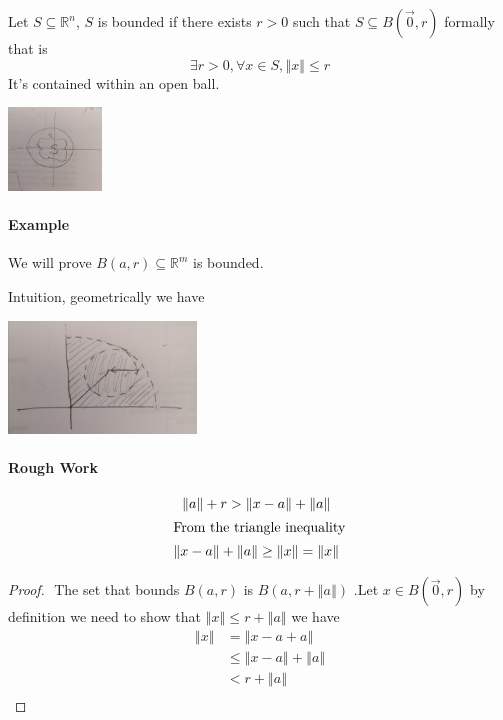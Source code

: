 \documentclass[11pt]{book}
\begin{document}
\begin{defn}[Bounded]\label{defn:bounded}
    Let $S \subseteq \mathbb{R} ^{n} $, $S$ is bounded if there exists $r > 0$ such that $S  \subseteq B\left(\vec{0} , r\right) $ formally that is 
    \[
    \exists r > 0, \forall x \in S, \left\Vert x \right\Vert \le r
    \]
    It's contained within an open ball.
    \begin{center}
        \includegraphics[width=25mm]{assets/lec3-bounded.jpg} 
    \end{center}
\end{defn}

\paragraph{Example} 
We will prove $B\left(a, r\right) \subseteq \mathbb{R} ^{m} $ is bounded.

Intuition, geometrically we have 
\begin{center}
    \includegraphics[width=50mm]{assets/lec3-bounded-prf.jpg} 
\end{center}

\paragraph{Rough Work}
\begin{gather}
    \left\Vert a \right\Vert  + r > \left\Vert x - a \right\Vert  + \left\Vert a \right\Vert \\
    \intertext{From the triangle inequality}
    \left\Vert x - a \right\Vert  + \left\Vert a \right\Vert \ge \left\Vert x \right\Vert = \left\Vert x \right\Vert 
\end{gather}

\begin{proof}
$ $\newline
    The set that bounds $B\left(a, r\right) $ is $B\left(a, r  + \left\Vert a \right\Vert \right) $ .Let $x \in B\left(\vec{0} , r\right) $ by definition we need to show that $\left\Vert x \right\Vert \le r + \left\Vert a \right\Vert $ we have 
    \begin{align*}
        \left\Vert x \right\Vert &= \left\Vert x  - a  + a \right\Vert \\
        &\le \left\Vert x - a \right\Vert  + \left\Vert a \right\Vert    \\ 
        &< r  + \left\Vert a \right\Vert    \\ 
    \end{align*}
\end{proof}
\end{document}
